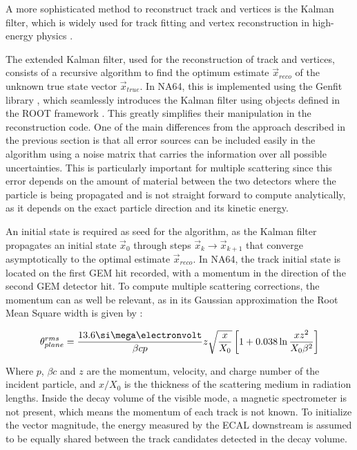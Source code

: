 A more sophisticated method to reconstruct track and vertices is the Kalman filter, which is widely used for track fitting and vertex reconstruction in high-energy physics \cite{HOPPNER2010518}.

The extended Kalman filter, used for the reconstruction of track and vertices, consists of a recursive algorithm to find the optimum estimate $\vec{x}_{reco}$ of the unknown true state vector $\vec{x}_{true}$. In NA64, this is implemented using the Genfit library \cite{genfit}, which seamlessly introduces the Kalman filter using objects defined in the ROOT framework \cite{root}. This greatly simplifies their manipulation in the reconstruction code. One of the main differences from the approach described in the previous section is that all error sources can be included easily in the algorithm using a noise matrix that carries the information over all possible uncertainties. This is particularly important for multiple scattering since this error depends on the amount of material between the two detectors where the particle is being propagated and is not straight forward to compute analytically, as it depends on the exact particle direction and its kinetic energy.

An initial state is required as seed for the algorithm, as the Kalman filter propagates an initial state $\vec{x}_0$ through steps $\vec{x}_k \rightarrow \vec{x}_{k+1}$ that converge asymptotically to the optimal estimate $\vec{x}_{reco}$. In NA64, the track initial state is located on the first GEM hit recorded, with a momentum in the direction of the second GEM detector hit. To compute multiple scattering corrections, the momentum can as well be relevant, as in its Gaussian approximation the Root Mean Square width is given by \cite{review-particle-physics}:

\begin{equation}
  \label{eq:mm-scattering}
  \theta_{plane}^{rms} = \frac{13.6 \mev}{\beta c p} z \sqrt{\frac{x}{X_0}} \left[ 1 + 0.038 \ln{\frac{x z^2}{X_0 \beta^2}} \right]
\end{equation}

Where $p$, $\beta c$ and $z$ are the momentum, velocity, and charge number of the incident particle, and $x/X_0$ is the thickness of the scattering medium in radiation lengths. Inside the decay volume of the visible mode, a magnetic spectrometer is not present, which means the momentum of each track is not known. To initialize the vector magnitude, the energy measured by the ECAL downstream is assumed to be equally shared between the track candidates detected in the decay volume.

